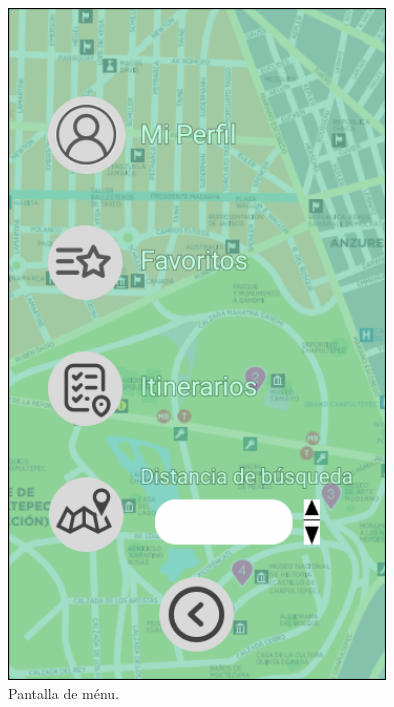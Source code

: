 \begin{figure}[htb]
    \centering
    \includegraphics[width=10cm]{pantalla7.png}
    \caption{Pantalla de ménu.}
    \label{fig:enter-label}
\end{figure}

